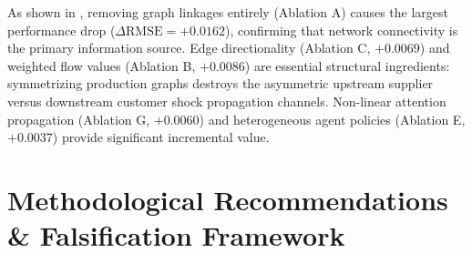 \documentclass[11pt,a4paper]{article}
\begin{document}
\begin{table}[htbp]
\centering
\caption{\textbf{Ablation Study Results on Held-Out 2020 Test Set}}
\label{tab:ablations}
\small
{}
\end{table}

As shown in , removing graph linkages entirely (Ablation A) causes the largest performance drop ($\Delta\text{RMSE} = +0.0162$), confirming that network connectivity is the primary information source. Edge directionality (Ablation C, $+0.0069$) and weighted flow values (Ablation B, $+0.0086$) are essential structural ingredients: symmetrizing production graphs destroys the asymmetric upstream supplier versus downstream customer shock propagation channels. Non-linear attention propagation (Ablation G, $+0.0060$) and heterogeneous agent policies (Ablation E, $+0.0037$) provide significant incremental value.

\section{Methodological Recommendations \& Falsification Framework}
\label{sec:falsification}
\end{document}

